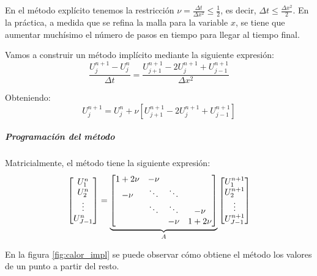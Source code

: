 En el método explícito tenemos la restricción $\nu=\frac{\Delta t}{\Delta x ^2} \le \frac{1}{2}$, es decir, $\Delta t \le \frac{\Delta x ^2}{2}$. En la práctica, a medida que se refina la malla para la variable $x$, se tiene que aumentar muchísimo el número de pasos en tiempo para llegar al tiempo final.
 
Vamos a construir un método implícito mediante la siguiente expresión:
$$\frac{U_j^{n+1}-U_j^n}{\Delta t} = \frac{U_{j+1}^{n+1}-2U_{j}^{n+1}+U_{j-1}^{n+1}}{\Delta x^2}$$

Obteniendo:
$$U_j^{n+1} = U_j^n + \nu \left[U_{j+1}^{n+1}-2U_{j}^{n+1}+U_{j-1}^{n+1}\right]$$

\subparagraph{Programación del método}\mbox{}

Matricialmente, el método tiene la siguiente expresión:
\begin{equation*}
		\begin{array}{l l l}
			\begin{bmatrix}
				U_1^{n}\\
				U_2^{n}\\
				\vdots\\
				U_{J-1}^{n}\\
			\end{bmatrix}
			=
			\underbrace{
			\begin{bmatrix}
				1+2\nu & -\nu       &        & \\
				-\nu    & \ddots    & \ddots & \\
				& \ddots & \ddots & -\nu\\
				&        & -\nu    & 1+2\nu\\
			\end{bmatrix}}_{A}
			\begin{bmatrix}
				U_1^{n+1}\\
				U_2^{n+1}\\
				\vdots\\
				U_{J-1}^{n+1}\\
			\end{bmatrix}
		\end{array}
\end{equation*}

En la figura \ref{fig:calor_impl} se puede observar cómo obtiene el método los valores de un punto a partir del resto.

